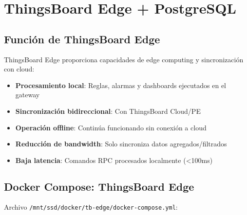 \section{ThingsBoard Edge + PostgreSQL}

\subsection{Función de ThingsBoard Edge}

ThingsBoard Edge proporciona capacidades de edge computing y sincronización con cloud:

\begin{itemize}
    \item \textbf{Procesamiento local}: Reglas, alarmas y dashboards ejecutados en el gateway
    \item \textbf{Sincronización bidireccional}: Con ThingsBoard Cloud/PE
    \item \textbf{Operación offline}: Continúa funcionando sin conexión a cloud
    \item \textbf{Reducción de bandwidth}: Solo sincroniza datos agregados/filtrados
    \item \textbf{Baja latencia}: Comandos RPC procesados localmente (<100ms)
\end{itemize}

\subsection{Docker Compose: ThingsBoard Edge}

Archivo \texttt{/mnt/ssd/docker/tb-edge/docker-compose.yml}:

